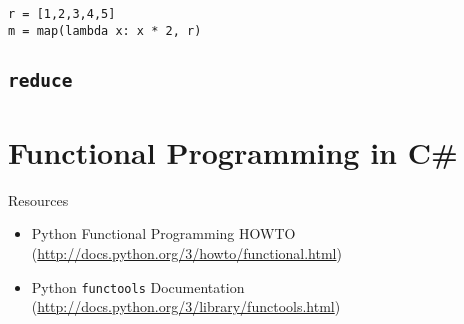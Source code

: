\documentclass[ignorenonframetext,red]{beamer}
\begin{document}
\begin{frame}[fragile]
\begin{lstlisting}[style=python,caption={Doubling Each Element},label={lst:map1}]
r = [1,2,3,4,5]
m = map(lambda x: x * 2, r)
\end{lstlisting}
\end{frame}

\subsection{\tt reduce}


\section{Functional Programming in C\#}
\begin{frame}
\end{frame}

\begin{frame}{Resources}
\begin{itemize}
	\item Python Functional Programming HOWTO\\(\url{http://docs.python.org/3/howto/functional.html})
	\item Python {\tt functools} Documentation\\(\url{http://docs.python.org/3/library/functools.html})
\end{itemize}
\end{frame}
\end{document}
